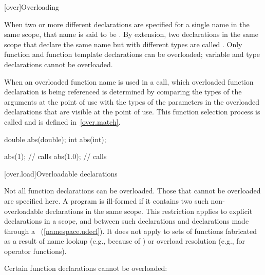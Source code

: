 [over]{Overloading}%


\pnum
{}%
%
%
When two or more different declarations are specified for a single name
in the same scope, that name is said to be
.
By extension, two declarations in the same scope that declare the same name
but with different types are called
.
Only function and function template
declarations can be overloaded; variable and type declarations
cannot be overloaded.

\pnum
When an overloaded function name is used in a call, which overloaded function
declaration is being referenced is determined by comparing the types
of the arguments at the point of use with the types of the parameters
in the overloaded declarations that are visible at the point of use.
This function selection process is called
and
is defined in~\ref{over.match}.
\enterexample

%
\begin{codeblock}
double abs(double);
int abs(int);

abs(1);             // calls 
abs(1.0);           // calls 
\end{codeblock}
\exitexample

[over.load]{Overloadable declarations}
%

\pnum
{}%
Not all function declarations can be overloaded.
Those that cannot be
overloaded are specified here.
A program is ill-formed if it contains
two such non-overloadable declarations in the same scope.
\enternote
This restriction applies to explicit declarations in a scope, and between
such declarations and
declarations made through a
~(\ref{namespace.udecl}).
It does not apply to sets of functions fabricated as a result of
name lookup (e.g., because of
)
or overload resolution
(e.g., for operator functions).
\exitnote

\pnum
Certain function declarations cannot be overloaded:

